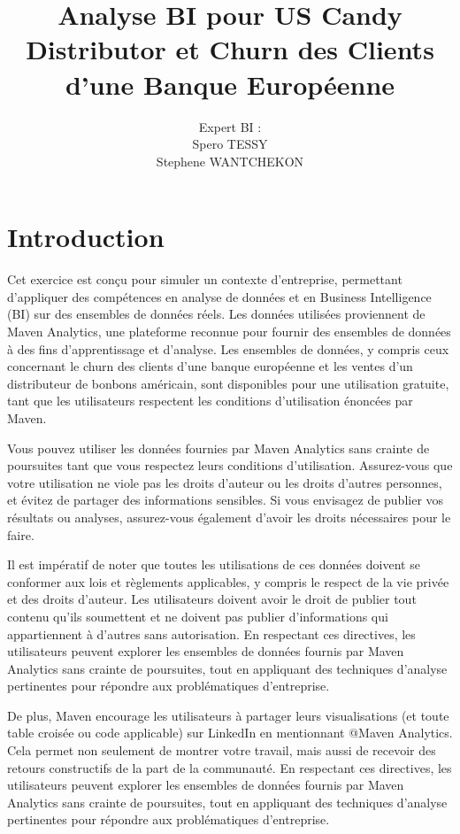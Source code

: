 \documentclass{article}
\title{Analyse BI pour \textbf{US Candy Distributor} et \textbf{Churn des Clients d'une Banque Européenne} }
\author{Expert BI : \\ Spero TESSY \\ Stephene WANTCHEKON}
\begin{document}
\maketitle










\section{Introduction}

Cet exercice est conçu pour simuler un contexte d'entreprise, permettant d'appliquer des compétences en analyse de données et en Business Intelligence (BI) sur des ensembles de données réels. Les données utilisées proviennent de Maven Analytics, une plateforme reconnue pour fournir des ensembles de données à des fins d'apprentissage et d'analyse. Les ensembles de données, y compris ceux concernant le churn des clients d'une banque européenne et les ventes d'un distributeur de bonbons américain, sont disponibles pour une utilisation gratuite, tant que les utilisateurs respectent les conditions d'utilisation énoncées par Maven.

Vous pouvez utiliser les données fournies par Maven Analytics sans crainte de poursuites tant que vous respectez leurs conditions d'utilisation. Assurez-vous que votre utilisation ne viole pas les droits d'auteur ou les droits d'autres personnes, et évitez de partager des informations sensibles. Si vous envisagez de publier vos résultats ou analyses, assurez-vous également d'avoir les droits nécessaires pour le faire.

Il est impératif de noter que toutes les utilisations de ces données doivent se conformer aux lois et règlements applicables, y compris le respect de la vie privée et des droits d'auteur. Les utilisateurs doivent avoir le droit de publier tout contenu qu'ils soumettent et ne doivent pas publier d'informations qui appartiennent à d'autres sans autorisation. En respectant ces directives, les utilisateurs peuvent explorer les ensembles de données fournis par Maven Analytics sans crainte de poursuites, tout en appliquant des techniques d'analyse pertinentes pour répondre aux problématiques d'entreprise.



De plus, Maven encourage les utilisateurs à partager leurs visualisations (et toute table croisée ou code applicable) sur LinkedIn en mentionnant @Maven Analytics. Cela permet non seulement de montrer votre travail, mais aussi de recevoir des retours constructifs de la part de la communauté. En respectant ces directives, les utilisateurs peuvent explorer les ensembles de données fournis par Maven Analytics sans crainte de poursuites, tout en appliquant des techniques d'analyse pertinentes pour répondre aux problématiques d'entreprise.
\end{document}
